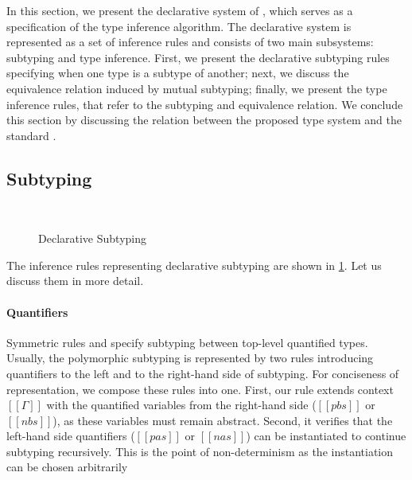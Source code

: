 \label{sec:declarative-system}

In this section, we present the declarative system of \fexists,
which serves as a specification of the type inference algorithm.
The declarative system is represented as a set of inference rules
and consists of two main subsystems: subtyping and type inference.
First, we present the declarative subtyping rules specifying 
when one type is a subtype of another; next, we discuss 
the equivalence relation induced by mutual subtyping;
finally, we present the type inference rules,
that refer to the subtyping and equivalence relation.
We conclude this section by discussing the relation between the
proposed type system and the standard \systemf.

\subsection{Subtyping}

\begin{figure}
  \begin{minipage}[t]{0.49\textwidth}
    \ottdefnDOneNsubLabeled{}
  \end{minipage}%
  \begin{minipage}[t]{0.49\textwidth}
    \ottdefnDOnePsupLabeled{}
  \end{minipage}
  \hfill\\
  \begin{minipage}[t]{0.49\textwidth}
    \ottdefnDOneNeqLabeled{}
  \end{minipage}%
  \begin{minipage}[t]{0.49\textwidth}
    \ottdefnDOnePeqLabeled{}
  \end{minipage}
  \caption{Declarative Subtyping}
  \label{fig:declarative-subtyping}
\end{figure}

The inference rules representing declarative subtyping are shown in
\cref{fig:declarative-subtyping}. Let us discuss them in more detail.

\paragraph{Quantifiers}  
Symmetric rules  and 
 specify 
subtyping between top-level quantified types.
Usually, the polymorphic subtyping is represented by two rules
introducing quantifiers to the left and to the right-hand side of subtyping.
For conciseness of representation, we compose these rules into one.
First, our rule extends context $[[Γ]]$ with the quantified variables 
from the right-hand side ($[[pbs]]$ or $[[nbs]]$), 
as these variables must remain abstract.
Second, it verifies that the left-hand side quantifiers
($[[pas]]$ or $[[nas]]$) can be instantiated to continue subtyping recursively. 
This is the point of non-determinism as the instantiation can be chosen arbitrarily

